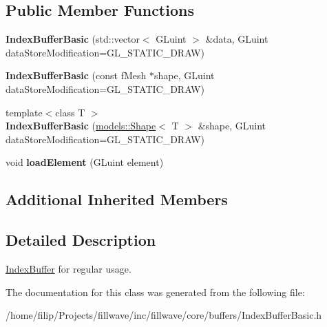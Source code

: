 \subsection*{Public Member Functions}
\begin{DoxyCompactItemize}
\item 
\hypertarget{classfillwave_1_1core_1_1IndexBufferBasic_ae008135e437a26363f46be5eac681e14}{}{\bfseries Index\+Buffer\+Basic} (std\+::vector$<$ G\+Luint $>$ \&data, G\+Luint data\+Store\+Modification=G\+L\+\_\+\+S\+T\+A\+T\+I\+C\+\_\+\+D\+R\+A\+W)\label{classfillwave_1_1core_1_1IndexBufferBasic_ae008135e437a26363f46be5eac681e14}

\item 
\hypertarget{classfillwave_1_1core_1_1IndexBufferBasic_adc40119fe347fc71cc04e1e70adb1f03}{}{\bfseries Index\+Buffer\+Basic} (const f\+Mesh $\ast$shape, G\+Luint data\+Store\+Modification=G\+L\+\_\+\+S\+T\+A\+T\+I\+C\+\_\+\+D\+R\+A\+W)\label{classfillwave_1_1core_1_1IndexBufferBasic_adc40119fe347fc71cc04e1e70adb1f03}

\item 
\hypertarget{classfillwave_1_1core_1_1IndexBufferBasic_addcddfa772344e0d71abcd269a416425}{}{\footnotesize template$<$class T $>$ }\\{\bfseries Index\+Buffer\+Basic} (\hyperlink{classfillwave_1_1models_1_1Shape}{models\+::\+Shape}$<$ T $>$ \&shape, G\+Luint data\+Store\+Modification=G\+L\+\_\+\+S\+T\+A\+T\+I\+C\+\_\+\+D\+R\+A\+W)\label{classfillwave_1_1core_1_1IndexBufferBasic_addcddfa772344e0d71abcd269a416425}

\item 
\hypertarget{classfillwave_1_1core_1_1IndexBufferBasic_a94e49eedf7f174df1c8cd6da229edf91}{}void {\bfseries load\+Element} (G\+Luint element)\label{classfillwave_1_1core_1_1IndexBufferBasic_a94e49eedf7f174df1c8cd6da229edf91}

\end{DoxyCompactItemize}
\subsection*{Additional Inherited Members}


\subsection{Detailed Description}
\hyperlink{classfillwave_1_1core_1_1IndexBuffer}{Index\+Buffer} for regular usage. 

The documentation for this class was generated from the following file\+:\begin{DoxyCompactItemize}
\item 
/home/filip/\+Projects/fillwave/inc/fillwave/core/buffers/Index\+Buffer\+Basic.\+h\end{DoxyCompactItemize}
